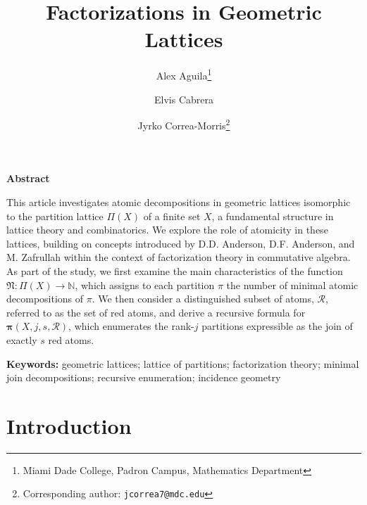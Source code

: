 \documentclass[12pt]{extarticle}
\title{\textbf{Factorizations in Geometric Lattices}}
\author{
  Alex Aguila\thanks{Miami Dade College, Padron Campus, Mathematics Department} \and 
  Elvis Cabrera \and 
  Jyrko Correa-Morris\thanks{Corresponding author: \texttt{jcorrea7@mdc.edu}}
}
\date{}
\begin{document}
\maketitle

\vspace{-1em}
\begin{center}
\textbf{\large Abstract}
\end{center}
\vspace{0.75em}  %
\begin{center}
\begin{minipage}{0.85\linewidth}
\small
This article investigates atomic decompositions in geometric lattices isomorphic to the partition lattice $\Pi(X)$ of a finite set $X$, a fundamental structure in lattice theory and combinatorics. We explore the role of atomicity in these lattices, building on concepts introduced by D.D. Anderson, D.F. Anderson, and M. Zafrullah within the context of factorization theory in commutative algebra. As part of the study, we first examine the main characteristics of the function $\mathfrak{N}\colon \Pi(X) \rightarrow \mathbb{N}$, which assigns to each partition $\pi$ the number of minimal atomic decompositions of $\pi$. We then consider a distinguished subset of atoms,  $\mathcal{R}$, referred to as the set of red atoms, and derive a recursive formula for $\pmb{\pi}(X, j, s, \mathcal{R})$, which enumerates the rank-$j$ partitions expressible as the join of exactly $s$ red atoms.
\end{minipage}
\end{center}
\vspace{1em}


\noindent\textbf{Keywords: }geometric lattices; lattice of partitions; factorization theory; minimal join decompositions; recursive enumeration; incidence geometry

	
	\section{Introduction} 
	
\end{document}
